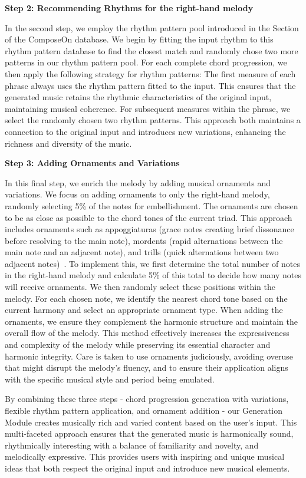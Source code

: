 \textbf{Step 2: Recommending Rhythms for the right-hand melody}

In the second step, we employ the rhythm pattern pool introduced in the Section of the ComposeOn database. We begin by fitting the input rhythm to this rhythm pattern database to find the closest match and randomly chose two more patterns in our rhythm pattern pool. For each complete chord progression, we then apply the following strategy for rhythm patterns: The first measure of each phrase always uses the rhythm pattern fitted to the input. This ensures that the generated music retains the rhythmic characteristics of the original input, maintaining musical coherence. For subsequent measures within the phrase, we select the randomly chosen two rhythm patterns. This approach both maintains a connection to the original input and introduces new variations, enhancing the richness and diversity of the music.

\textbf{Step 3: Adding Ornaments and Variations}

In this final step, we enrich the melody by adding musical ornaments and variations. We focus on adding ornaments to only the right-hand melody, randomly selecting 5\% of the notes for embellishment. The ornaments are chosen to be as close as possible to the chord tones of the current triad. This approach includes ornaments such as appoggiaturas (grace notes creating brief dissonance before resolving to the main note), mordents (rapid alternations between the main note and an adjacent note), and trills (quick alternations between two adjacent notes)~\cite{adler1989study}. To implement this, we first determine the total number of notes in the right-hand melody and calculate 5\% of this total to decide how many notes will receive ornaments. We then randomly select these positions within the melody. For each chosen note, we identify the nearest chord tone based on the current harmony and select an appropriate ornament type. When adding the ornaments, we ensure they complement the harmonic structure and maintain the overall flow of the melody. This method effectively increases the expressiveness and complexity of the melody while preserving its essential character and harmonic integrity. Care is taken to use ornaments judiciously, avoiding overuse that might disrupt the melody's fluency, and to ensure their application aligns with the specific musical style and period being emulated.

By combining these three steps - chord progression generation with variations, flexible rhythm pattern application, and ornament addition - our Generation Module creates musically rich and varied content based on the user's input. This multi-faceted approach ensures that the generated music is harmonically sound, rhythmically interesting with a balance of familiarity and novelty, and melodically expressive. This provides users with inspiring and unique musical ideas that both respect the original input and introduce new musical elements.
